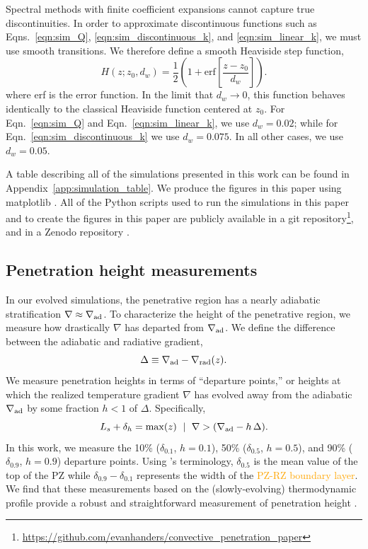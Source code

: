 \documentclass[twocolumn, linenumbers]{aastex631}
\newcommand{\gradrad}{\ensuremath{\nabla_{\rm{rad}}}}
\newcommand{\gradad}{\ensuremath{\nabla_{\rm{ad}}}}
\newcommand{\justgrad}{\ensuremath{\nabla}}
\newcommand{\editone}[1]{\textcolor{orange}{#1}}
\begin{document}
Spectral methods with finite coefficient expansions cannot capture true discontinuities.
In order to approximate discontinuous functions such as Eqns.~\ref{eqn:sim_Q}, \ref{eqn:sim_discontinuous_k}, and \ref{eqn:sim_linear_k}, we must use smooth transitions.
We therefore define a smooth Heaviside step function,
\begin{equation}
H(z; z_0, d_w) = \frac{1}{2}\left(1 + \mathrm{erf}\left[\frac{z - z_0}{d_w}\right]\right).
\label{eqn:heaviside}
\end{equation}
where erf is the error function.
In the limit that $d_w \rightarrow 0$, this function behaves identically to the classical Heaviside function centered at $z_0$.
For Eqn.~\ref{eqn:sim_Q} and Eqn.~\ref{eqn:sim_linear_k}, we use $d_w = 0.02$; while for Eqn.~\ref{eqn:sim_discontinuous_k} we use $d_w = 0.075$.
In all other cases, we use $d_w = 0.05$.

A table describing all of the simulations presented in this work can be found in Appendix~\ref{app:simulation_table}.
We produce the figures in this paper using matplotlib \citep{hunter2007, mpl3.3.4}.
All of the Python scripts used to run the simulations in this paper and to create the figures in this paper are publicly available in a git repository\footnote{\url{https://github.com/evanhanders/convective_penetration_paper}}, and in a Zenodo repository \citep{supp}.

\subsection{Penetration height measurements}
In our evolved simulations, the penetrative region has a nearly adiabatic stratification $\justgrad \approx \gradad$.
To characterize the height of the penetrative region, we measure how drastically $\justgrad$ has departed from $\gradad$.
We define the difference between the adiabatic and radiative gradient,
\begin{equation}
\Delta \equiv \gradad - \gradrad(z).
\end{equation}
We measure penetration heights in terms of ``departure points,'' or heights at which the realized temperature gradient $\justgrad$ has evolved away from the adiabatic $\gradad$ by some fraction $h < 1$ of $\Delta$.
Specifically,
\begin{equation}
L_s + \delta_{h} = \mathrm{max}(z) \,\,\mid\,\, \justgrad > (\gradad - h\,\Delta).
\label{eqn:delta_p_measures}
\end{equation}
In this work, we measure the 10\% ($\delta_{0.1}$, $h=0.1$), 50\% ($\delta_{0.5}$, $h=0.5$), and 90\% ($\delta_{0.9}$, $h=0.9$) departure points.
Using \citet{zahn1991}'s terminology, $\delta_{0.5}$ is the mean value of the top of the PZ while $\delta_{0.9} - \delta_{0.1}$ represents the width of the \editone{PZ-RZ boundary layer}. 
We find that these measurements based on the (slowly-evolving) thermodynamic profile provide a robust and straightforward measurement of penetration height \citep[for a discussion of alternate measurement choices, see][]{pratt_etal_2017}.
\end{document}
